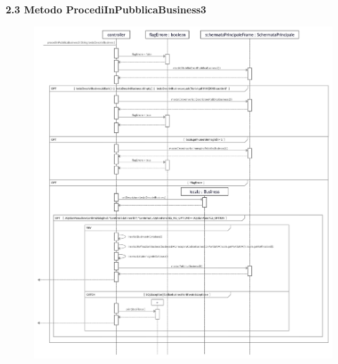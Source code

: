 \documentclass[a4paper,12pt]{article}
\begin{document}
\newpage\null{}\setcounter{page}{7}
\begin{flushleft}
\vspace*{+1cm}
{\bf\normalsize 2.3 Metodo ProcediInPubblicaBusiness3 }
\begin{center}
	\begin{figure}[h]
	\centering
 	\includegraphics[width=1\textwidth]{ProcediInPubblicaBusiness3.jpg}
	\end{figure}
\end{center}
\end{flushleft}
\newpage
\end{document}

